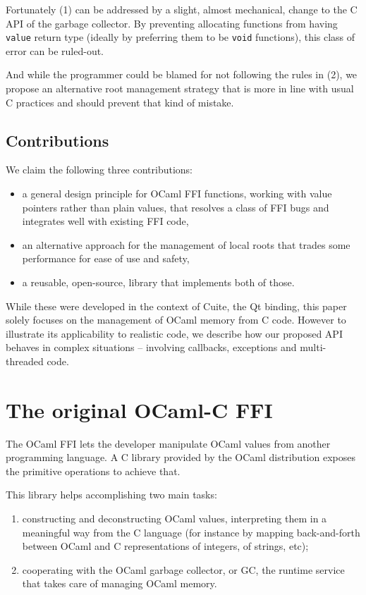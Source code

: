 \documentclass[a4paper]{easychair}
\begin{document}
Fortunately (1) can be addressed by a slight, almost mechanical, change
to the C API of the garbage collector. By preventing allocating
functions from having \texttt{value} return type (ideally by preferring
them to be \texttt{void} functions), this class of error can be
ruled-out.

And while the programmer could be blamed for not following the rules in
(2), we propose an alternative root management strategy that is more in
line with usual C practices and should prevent that kind of mistake.

\subsection{Contributions}

We claim the following three contributions:

\begin{itemize}
\item a general design principle for OCaml FFI functions, working with value
      pointers rather than plain values, that resolves a class of FFI bugs and
      integrates well with existing FFI code,
\item an alternative approach for the management of local roots that trades
      some performance for ease of use and safety,
\item a reusable, open-source, library that implements both of those.
\end{itemize}

While these were developed in the context of Cuite, the Qt binding, this
paper solely focuses on the management of OCaml memory from C code.
However to illustrate its applicability to realistic code, we describe
how our proposed API behaves in complex situations -- involving
callbacks, exceptions and multi-threaded code.

\section{The original OCaml-C FFI}

The OCaml FFI lets the developer manipulate OCaml values from another
programming language. A C library provided by the OCaml distribution
exposes the primitive operations to achieve that.

This library helps accomplishing two main tasks:

\begin{enumerate}
\item constructing and deconstructing OCaml values, interpreting them in a
      meaningful way from the C language (for instance by mapping
      back-and-forth between OCaml and C representations of integers, of
      strings, etc);
\item cooperating with the OCaml garbage collector, or GC, the runtime
      service that takes care of managing OCaml memory.
\end{enumerate}
\end{document}
